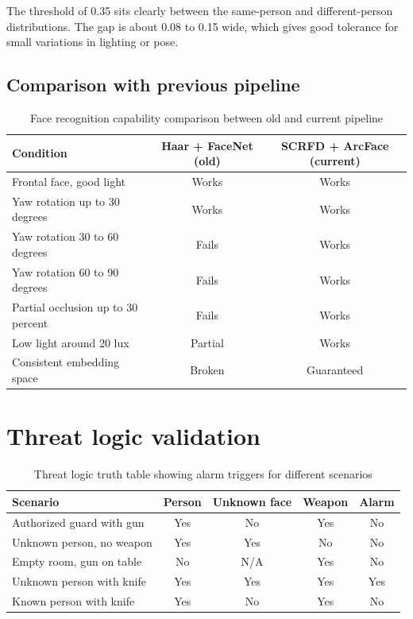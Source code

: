 \documentclass[12pt,a4paper]{report}
\begin{document}
The threshold of 0.35 sits clearly between the same-person and different-person distributions. The gap is about 0.08 to 0.15 wide, which gives good tolerance for small variations in lighting or pose.

\subsection{Comparison with previous pipeline}

\begin{table}[htbp]
\centering
\begin{tabular}{|l|c|c|}
\hline
\textbf{Condition} & \textbf{Haar + FaceNet (old)} & \textbf{SCRFD + ArcFace (current)} \\
\hline
Frontal face, good light                  & Works       & Works \\
Yaw rotation up to 30 degrees             & Works       & Works \\
Yaw rotation 30 to 60 degrees             & Fails       & Works \\
Yaw rotation 60 to 90 degrees             & Fails       & Works \\
Partial occlusion up to 30 percent        & Fails       & Works \\
Low light around 20 lux                   & Partial     & Works \\
Consistent embedding space                & Broken      & Guaranteed \\
\hline
\end{tabular}
\caption{Face recognition capability comparison between old and current pipeline}
\label{tab:face_compare}
\end{table}

\section{Threat logic validation}

\begin{table}[htbp]
\centering
\begin{tabular}{|l|c|c|c|c|}
\hline
\textbf{Scenario} & \textbf{Person} & \textbf{Unknown face} & \textbf{Weapon} & \textbf{Alarm} \\
\hline
Authorized guard with gun    & Yes & No  & Yes & No  \\
Unknown person, no weapon    & Yes & Yes & No  & No  \\
Empty room, gun on table     & No  & N/A & Yes & No  \\
Unknown person with knife    & Yes & Yes & Yes & Yes \\
Known person with knife      & Yes & No  & Yes & No  \\
\hline
\end{tabular}
\caption{Threat logic truth table showing alarm triggers for different scenarios}
\label{tab:threat_logic}
\end{table}
\end{document}

